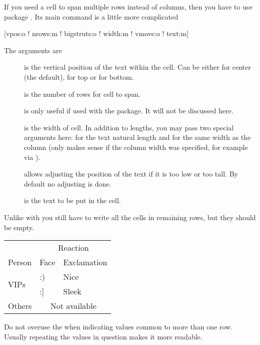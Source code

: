 If you need a cell to span multiple rows instead of columns, then you have to
use package . Its main command is a little more complicated
\begin{lscommand}
  [vpos:o ! nrows:m ! bigstruts:o ! width:m ! vmove:o ! text:m]
\end{lscommand}
The arguments are
\begin{description}
  \item[] is the vertical position of the text within the cell.
    Can be either  for center (the default),  for top or
     for bottom.
  \item[] is the number of rows for cell to span.
  \item[] is only useful if used with the 
    package. It will not be discussed here.
  \item[] is the width of cell. In addition to lengths, you may
    pass two special arguments here: \cargv{*} for the text natural length and
    \cargv{=} for the same width as the column (only makes sense if the column
    width was specified, for example via ).
  \item[] allows adjusting the position of the text if it is too
    low or too tall. By default no adjusting is done.
  \item[] is the text to be put in the cell.
\end{description}
Unlike with  you still have to write all the cells in remaining
rows, but they should be empty.
\begin{example}[examplewidth=0.4\linewidth]
\begin{tabular}{@{}lll@{}}
  \toprule
                & \multicolumn{2}{c}{
                    Reaction}        \\
  \cmidrule(l){2-3}
  Person        & Face & Exclamation \\
  \midrule
  \multirow[t]{
    2}{*}{VIPs} & :)   & Nice        \\
                & :]   & Sleek       \\
  Others        & \multicolumn{2}{c}{
                    Not available}   \\
  \bottomrule
\end{tabular}
\end{example}
Do not overuse the  when indicating values common to more than one
row. Usually repeating the values in question makes it more readable.

